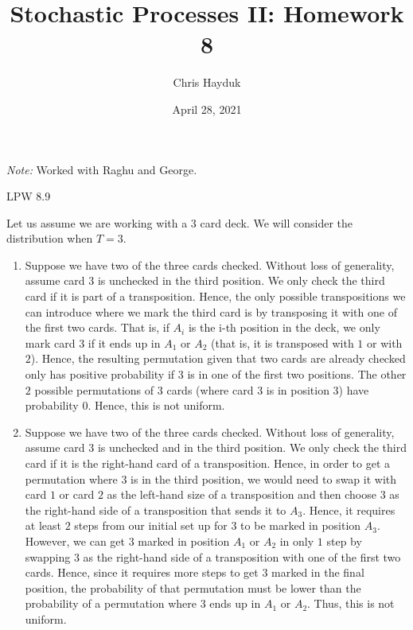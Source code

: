 \documentclass[12pt]{article}
\newenvironment{problem}[2][Problem]{\begin{trivlist}
\item[\hskip \labelsep {\bfseries #1}\hskip \labelsep {\bfseries #2.}]}{\end{trivlist}}
\begin{document}
\title{Stochastic Processes II: Homework 8}

\author{Chris Hayduk}
\date{April 28, 2021}

\maketitle

\textit{Note:} Worked with Raghu and George.

\begin{problem}{I}
LPW 8.9
\end{problem}

Let us assume we are working with a $3$ card deck. We will consider the distribution when $T = 3$.

\begin{enumerate}[\alph*)]

\item Suppose we have two of the three cards checked. Without loss of generality, assume card $3$ is unchecked in the third position. We only check the third card if it is part of a transposition. Hence, the only possible transpositions we can introduce where we mark the third card is by transposing it with one of the first two cards. That is, if $A_i$ is the i-th position in the deck, we only mark card $3$ if it ends up in $A_1$ or $A_2$ (that is, it is transposed with $1$ or with $2$). Hence, the resulting permutation given that two cards are already checked only has positive probability if $3$ is in one of the first two positions. The other $2$ possible permutations of $3$ cards (where card $3$ is in position $3$) have probability $0$. Hence, this is not uniform.

\item Suppose we have two of the three cards checked. Without loss of generality, assume card $3$ is unchecked and in the third position. We only check the third card if it is the right-hand card of a transposition. Hence, in order to get a permutation where $3$ is in the third position, we would need to swap it with card $1$ or card $2$ as the left-hand size of a transposition and then choose $3$ as the right-hand side of a transposition that sends it to $A_3$. Hence, it requires at least $2$ steps from our initial set up for $3$ to be marked in position $A_3$. However, we can get $3$ marked in position $A_1$ or $A_2$ in only $1$ step
by swapping $3$ as the right-hand side of a transposition with one of the first two cards. Hence, since it requires more steps to get $3$ marked in the final position, the probability of that permutation must be lower than the probability of a permutation where $3$ ends up in $A_1$ or $A_2$. Thus, this is not uniform.
\end{enumerate}
\end{document}
